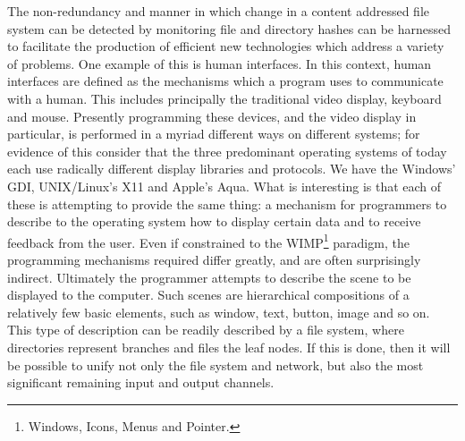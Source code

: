 \documentclass[british,english]{article}
\begin{document}
The non-redundancy and manner in which change in a content addressed
file system can be detected by monitoring file and directory hashes
can be harnessed to facilitate the production of efficient new technologies
which address a variety of problems. One example of this is human
interfaces. In this context, human interfaces are defined as the mechanisms
which a program uses to communicate with a human. This includes principally
the traditional video display, keyboard and mouse. Presently programming
these devices, and the video display in particular, is performed in
a myriad different ways on different systems; for evidence of this
consider that the three predominant operating systems of today each
use radically different display libraries and protocols. We have the
Windows' GDI, UNIX/Linux's X11 and Apple's Aqua. What is interesting
is that each of these is attempting to provide the same thing: a mechanism
for programmers to describe to the operating system how to display
certain data and to receive feedback from the user. Even if constrained
to the WIMP\footnote{Windows, Icons, Menus and Pointer.} paradigm, the programming mechanisms required differ greatly, and
are often surprisingly indirect. Ultimately the programmer attempts
to describe the scene to be displayed to the computer. Such scenes
are hierarchical compositions of a relatively few basic elements,
such as window, text, button, image and so on. This type of description
can be readily described by a file system, where directories represent
branches and files the leaf nodes. If this is done, then it will be
possible to unify not only the file system and network, but also the
most significant remaining input and output channels.
\end{document}
